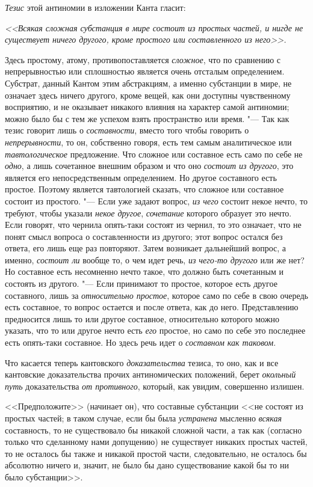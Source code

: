 {\em Тезис} этой антиномии в изложении Канта гласит:

{\em <<Всякая сложная субстанция в мире состоит из
простых частей, и нигде не существует ничего другого, кроме простого или
составленного из него>>.}

Здесь простому, атому, противопоставляется
{\em сложное}, что по сравнению с непрерывностью или
сплошностью является очень отсталым определением. Субстрат, данный Кантом
этим абстракциям, а именно субстанции в мире, не означает здесь ничего
другого, кроме вещей, как они доступны чувственному восприятию, и не
оказывает никакого влияния на характер самой антиномии; можно было бы с тем
же успехом взять пространство или время. "--- Так как тезис говорит лишь о
{\em составности}, вместо того чтобы говорить о
{\em непрерывности}, то он, собственно говоря, есть тем
самым аналитическое или {\em тавтологическое}
предложение. Что сложное или составное есть само по себе не
{\em одно}, а лишь сочетанное внешним образом и что оно
{\em состоит из другого}, это является его
непосредственным определением. Но другое составного есть простое. Поэтому
является тавтологией сказать, что сложное или составное состоит из
простого. "--- Если уже задают вопрос, {\em из чего}
состоит некое нечто, то требуют, чтобы указали
{\em некое другое}, {\em сочетание}
которого образует это нечто. Если говорят, что чернила опять-таки состоят
из чернил, то это означает, что не понят смысл вопроса о составленности из
другого; этот вопрос остался без ответа, его лишь еще раз повторяют. Затем
возникает дальнейший вопрос, а именно, {\em состоит ли}
вообще то, о чем идет речь, {\em из чего-то другого}
или же нет? Но составное есть несомненно нечто такое, что должно быть
сочетанным и состоять из другого. "--- Если принимают то простое, которое есть
другое составного, лишь за {\em относительно простое},
которое само по себе в свою очередь есть составное, то вопрос остается и
после ответа, как до него. Представлению предносится лишь то или другое
составное, относительно которого можно указать, что то или другое нечто
есть {\em его} простое, но само по себе это последнее
есть опять-таки составное. Но здесь речь идет о {\em составном как таковом}.

Что касается теперь кантовского {\em доказательства}
тезиса, то оно, как и все кантовские доказательства прочих антиномических
положений, берет {\em окольный путь} доказательства
{\em от противного}, который, как увидим, совершенно излишен.

<<Предположите>> (начинает он), что составные субстанции <<не состоят из
простых частей; в таком случае, если бы была {\em устранена} мысленно
{\em всякая} составность, то не существовало бы никакой
сложной части, а так как (согласно только что сделанному нами допущению) не
существует никаких простых частей, то не осталось бы также и никакой
простой части, следовательно, не осталось бы абсолютно ничего и, значит, не
было бы дано существование какой бы то ни было субстанции>>.

